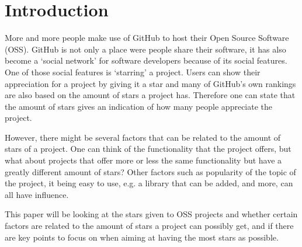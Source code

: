\section{Introduction}
    More and more people make use of GitHub to host their Open Source Software (OSS)\cite{github-2013}. 
    GitHub is not only a place were people share their software, it has also become a `social network' for software developers because of its social features. \cite{dabbish-2012} 
    One of those social features is `starring' a project. Users can show their appreciation for a project by giving it a  star and many of GitHub's own rankings are also based on the amount of stars a project has.\cite{github-stars-2016} 
    Therefore one can state that the amount of stars gives an indication of how many people appreciate the project.
    
    However, there might be several factors that can be related to the amount of stars of a project. 
    One can think of the functionality that the project offers, but what about projects that offer more or less the same functionality but have a greatly different amount of stars? Other factors such as popularity of the topic of the project, it being easy to use, e.g. a library that can be added, and more, can all have influence.
    
    This paper will be looking at the stars given to OSS projects and whether certain factors are related to the amount of stars a project can possibly get, and if there are key points to focus on when aiming at having the most stars as possible.





